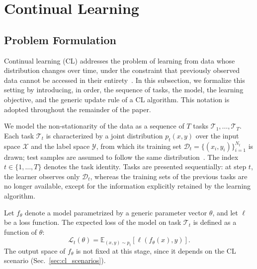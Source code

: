 
\section{Continual Learning}
\label{sec:cl}

\subsection{Problem Formulation}
Continual learning (CL) addresses the problem of learning from data whose distribution changes over time, under the constraint that previously observed data cannot be accessed in their entirety~\cite{van2022three}.
In this subsection, we formalize this setting by introducing, in order, the sequence of tasks, the model, the learning objective, and the generic update rule of a CL algorithm.
This notation is adopted throughout the remainder of the paper.

We model the non-stationarity of the data as a sequence of $T$ tasks $\mathcal{T}_1,\dots,\mathcal{T}_T$.
Each task $\mathcal{T}_t$ is characterized by a joint distribution $p_t(x,y)$ over the input space $\mathcal{X}$ and the label space $\mathcal{Y}$, from which its training set $\mathcal{D}_t=\{(x_i,y_i)\}_{i=1}^{N_t}$ is drawn; test samples are assumed to follow the same distribution~\cite{Wang2024tpami_cl}.
The index $t \in \{1,\dots,T\}$ denotes the task identity.
Tasks are presented sequentially: at step $t$, the learner observes only $\mathcal{D}_t$, whereas the training sets of the previous tasks are no longer available, except for the information explicitly retained by the learning algorithm.

Let $f_\theta$ denote a model parametrized by a generic parameter vector $\theta$, and let $\ell$ be a loss function.
The expected loss of the model on task $\mathcal{T}_t$ is defined as a function of $\theta$:
\begin{equation}
    \mathcal{L}_t(\theta) = \mathbb{E}_{(x,y)\sim p_t}\left[\ell\left(f_\theta(x), y\right)\right].
\end{equation}
The output space of $f_\theta$ is not fixed at this stage, since it depends on the CL scenario (Sec.~\ref{sec:cl_scenarios}).

